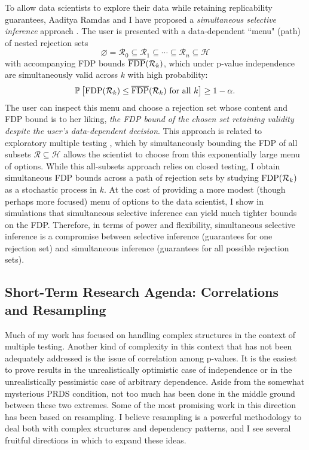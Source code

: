\documentclass[11pt]{article}
\newcommand{\fdp}{\textnormal{FDP}}
\newcommand{\fdpbar}{\overline{\textnormal{FDP}}}
\newcommand{\cR}{\mathcal R}
\newcommand{\PP}[1]{\mathbb P\left[#1\right]}
\begin{document}
To allow data scientists to explore their data while retaining replicability guarantees, Aaditya Ramdas and I have proposed a \textit{simultaneous selective inference} approach \cite{spotting}. The user is presented with a data-dependent ``menu" (path) of nested rejection sets 
\begin{equation*}
\varnothing = \cR_0 \subseteq \cR_1 \subseteq \cdots \subseteq \cR_n \subseteq \mathcal H
\end{equation*}
with accompanying FDP bounds $\fdpbar(\cR_k)$, which under p-value independence are simultaneously valid across $k$ with high probability:
\begin{equation*}
\PP{\fdp(\cR_k) \leq \fdpbar(\cR_k) \text{ for all } k} \geq 1-\alpha.
\end{equation*}
The user can inspect this menu and choose a rejection set whose content and FDP bound is to her liking, \textit{the FDP bound of the chosen set retaining validity despite the user's data-dependent decision}. This approach is related to exploratory multiple testing \cite{GS}, which by simultaneously bounding the FDP of all subsets $\cR \subseteq \mathcal H$ allows the scientist to choose from this exponentially large menu of options. While this all-subsets approach relies on closed testing, I obtain simultaneous FDP bounds across a path of rejection sets by studying $\fdp(\cR_k)$ as a stochastic process in $k$. At the cost of providing a more modest (though perhaps more focused) menu of options to the data scientist, I show in simulations that simultaneous selective inference can yield much tighter bounds on the FDP. Therefore, in terms of power and flexibility, simultaneous selective inference is a compromise between selective inference (guarantees for one rejection set) and simultaneous inference (guarantees for all possible rejection sets).


\subsection*{Short-Term Research Agenda: Correlations and Resampling}

Much of my work has focused on handling complex structures in the context of multiple testing. Another kind of complexity in this context that has not been adequately addressed is the issue of correlation among p-values. It is the easiest to prove results in the unrealistically optimistic case of independence or in the unrealistically pessimistic case of arbitrary dependence. Aside from the somewhat mysterious PRDS condition, not too much has been done in the middle ground between these two extremes. Some of the most promising work in this direction has been based on resampling. I believe resampling is a powerful methodology to deal both with complex structures and dependency patterns, and I see several fruitful directions in which to expand these ideas.
\end{document}
